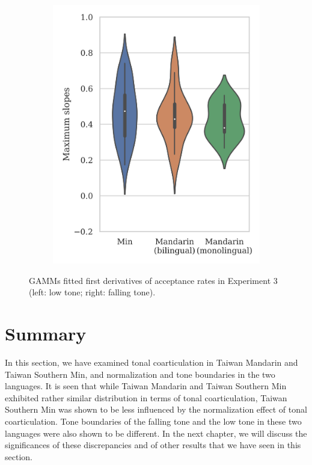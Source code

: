\begin{figure}[hbt!]
\begin{subfigure}[b]{.45\textwidth}
\includegraphics[width=\textwidth]{figures/E3/Result_51.png}
\end{subfigure}
\caption{GAMMs fitted first derivatives of acceptance rates in Experiment 3 (left: low tone; right: falling tone).}
\label{Figure:E3GAMM}
\end{figure}

\section{Summary}
In this section, we have examined tonal coarticulation in Taiwan Mandarin and Taiwan Southern Min, and normalization and tone boundaries in the two languages. It is seen that while Taiwan Mandarin and Taiwan Southern Min exhibited rather similar distribution in terms of tonal coarticulation, Taiwan Southern Min was shown to be less influenced by the normalization effect of tonal coarticulation. Tone boundaries of the falling tone and the low tone in these two languages were also shown to be different. In the next chapter, we will discuss the significances of these discrepancies and of other results that we have seen in this section.